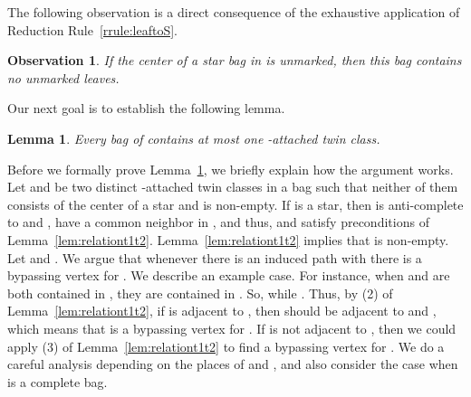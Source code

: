 \documentclass[11pt]{elsarticle}
\newtheorem{lemma}[theorem]{Lemma}
\newtheorem{observation}[theorem]{Observation}
\begin{document}
The following observation is a direct consequence of the exhaustive application 
of Reduction Rule~\ref{rrule:leaftoS}.


\begin{observation}\label{obs:starrestriction}
If the center of a star bag in  is unmarked, then this bag contains no unmarked leaves.
\end{observation}


Our next goal is to establish the following lemma.




\begin{lemma}\label{lem:twinclassreduction}
Every bag of  contains at most one -attached twin class.
\end{lemma}

Before we formally prove Lemma~\ref{lem:twinclassreduction}, we briefly explain how the argument works.
Let  and  be two distinct -attached twin classes in a bag  such that neither of them consists of the center of a star and  is non-empty.
If  is a star, then  is anti-complete to  and ,  have a common neighbor in , and thus,  and  satisfy preconditions of Lemma~\ref{lem:relationt1t2}.
Lemma~\ref{lem:relationt1t2} implies that  is non-empty. 
Let  and . 
We argue that whenever there is an induced path  with  there is a bypassing vertex for .
We describe an example case. For instance, when  and  are both contained in , they are contained in . 
So,  while .
Thus, by (2) of Lemma~\ref{lem:relationt1t2},
if  is adjacent to , then  should be adjacent to  and , which means that  is a bypassing vertex for .
If  is not adjacent to , then we could apply (3) of Lemma~\ref{lem:relationt1t2} to find a bypassing vertex for .
We do a careful analysis depending on the places of  and , and also consider the case when  is a complete bag.
\end{document}
